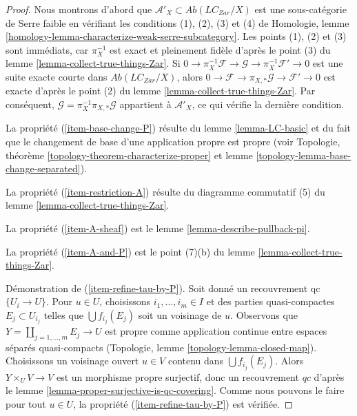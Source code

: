 \begin{proof}
Nous montrons d'abord que
$\mathcal{A}'_X \subset \textit{Ab}(\textit{LC}_{Zar}/X)$ est une
sous-catégorie de Serre faible en vérifiant les conditions (1), (2), (3) et
(4) de Homologie, lemme
\ref{homology-lemma-characterize-weak-serre-subcategory}.
Les points (1), (2) et (3) sont immédiats, car $\pi_X^{-1}$ est exact et
pleinement fidèle d'après le point (3) du
lemme \ref{lemma-collect-true-things-Zar}. Si
$0 \to \pi_X^{-1}\mathcal{F} \to \mathcal{G} \to \pi_X^{-1}\mathcal{F}' \to 0$
est une suite exacte courte dans $\textit{Ab}(\textit{LC}_{Zar}/X)$, alors
$0 \to \mathcal{F} \to \pi_{X, *}\mathcal{G} \to \mathcal{F}' \to 0$ est
exacte d'après le point (2) du lemme
\ref{lemma-collect-true-things-Zar}. Par conséquent,
$\mathcal{G} = \pi_X^{-1}\pi_{X, *}\mathcal{G}$ appartient à
$\mathcal{A}'_X$, ce qui vérifie la dernière condition.

\medskip\noindent
La propriété (\ref{item-base-change-P}) résulte du lemme
\ref{lemma-LC-basic} et du fait que le changement de base d'une application
propre est propre (voir Topologie, théorème
\ref{topology-theorem-characterize-proper} et lemme
\ref{topology-lemma-base-change-separated}).

\medskip\noindent
La propriété (\ref{item-restriction-A}) résulte du diagramme commutatif (5)
du lemme \ref{lemma-collect-true-things-Zar}.

\medskip\noindent
La propriété (\ref{item-A-sheaf}) est le
lemme \ref{lemma-describe-pullback-pi}.

\medskip\noindent
La propriété (\ref{item-A-and-P}) est le point (7)(b) du
lemme \ref{lemma-collect-true-things-Zar}.

\medskip\noindent
Démonstration de (\ref{item-refine-tau-by-P}). Soit donné un recouvrement qc
$\{U_i \to U\}$. Pour $u \in U$, choisissons $i_1, \ldots, i_m \in I$ et
des parties quasi-compactes $E_j \subset U_{i_j}$ telles que
$\bigcup f_{i_j}(E_j)$ soit un voisinage de $u$.
Observons que $Y = \coprod_{j = 1, \ldots, m} E_j \to U$ est propre comme
application continue entre espaces séparés quasi-compacts
(Topologie, lemme \ref{topology-lemma-closed-map}).
Choisissons un voisinage ouvert $u \in V$ contenu dans
$\bigcup f_{i_j}(E_j)$. Alors $Y \times_U V \to V$ est un morphisme propre
surjectif, donc un recouvrement $qc$ d'après le
lemme \ref{lemma-proper-surjective-is-qc-covering}.
Comme nous pouvons le faire pour tout $u \in U$, la propriété
(\ref{item-refine-tau-by-P}) est vérifiée.
\end{proof}

